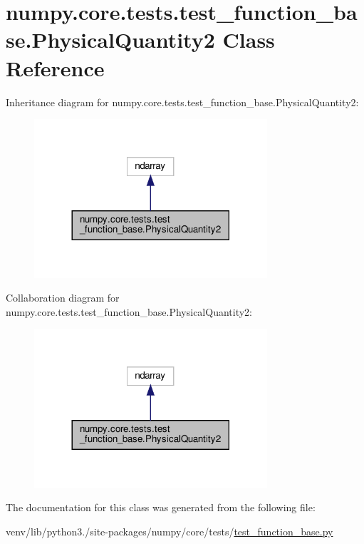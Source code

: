\hypertarget{classnumpy_1_1core_1_1tests_1_1test__function__base_1_1PhysicalQuantity2}{}\section{numpy.\+core.\+tests.\+test\+\_\+function\+\_\+base.\+Physical\+Quantity2 Class Reference}
\label{classnumpy_1_1core_1_1tests_1_1test__function__base_1_1PhysicalQuantity2}


Inheritance diagram for numpy.\+core.\+tests.\+test\+\_\+function\+\_\+base.\+Physical\+Quantity2\+:
\nopagebreak
\begin{figure}[H]
\begin{center}
\leavevmode
\includegraphics[width=245pt]{classnumpy_1_1core_1_1tests_1_1test__function__base_1_1PhysicalQuantity2__inherit__graph}
\end{center}
\end{figure}


Collaboration diagram for numpy.\+core.\+tests.\+test\+\_\+function\+\_\+base.\+Physical\+Quantity2\+:
\nopagebreak
\begin{figure}[H]
\begin{center}
\leavevmode
\includegraphics[width=245pt]{classnumpy_1_1core_1_1tests_1_1test__function__base_1_1PhysicalQuantity2__coll__graph}
\end{center}
\end{figure}


The documentation for this class was generated from the following file\+:\begin{DoxyCompactItemize}
\item 
venv/lib/python3./site-\/packages/numpy/core/tests/\hyperlink{core_2tests_2test__function__base_8py}{test\+\_\+function\+\_\+base.\+py}\end{DoxyCompactItemize}
